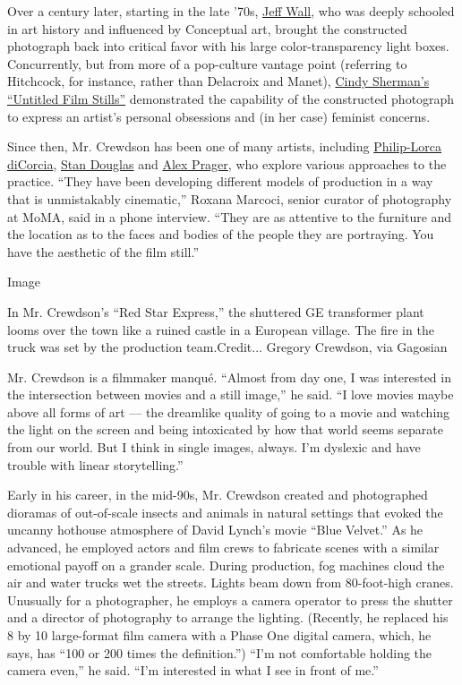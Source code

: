 Over a century later, starting in the late '70s,
\href{https://gagosian.com/artists/jeff-wall/}{Jeff Wall}, who was
deeply schooled in art history and influenced by Conceptual art, brought
the constructed photograph back into critical favor with his large
color-transparency light boxes. Concurrently, but from more of a
pop-culture vantage point (referring to Hitchcock, for instance, rather
than Delacroix and Manet),
\href{https://www.moma.org/learn/moma_learning/cindy-sherman-untitled-film-stills-1977-80/}{Cindy
Sherman's ``Untitled Film Stills''} demonstrated the capability of the
constructed photograph to express an artist's personal obsessions and
(in her case) feminist concerns.

Since then, Mr. Crewdson has been one of many artists, including
\href{https://www.moma.org/artists/7027}{Philip-Lorca diCorcia},
\href{https://www.davidzwirner.com/artists/stan-douglas/biography}{Stan
Douglas} and \href{https://www.alexprager.com/}{Alex Prager}, who
explore various approaches to the practice. ``They have been developing
different models of production in a way that is unmistakably
cinematic,'' Roxana Marcoci, senior curator of photography at MoMA, said
in a phone interview. ``They are as attentive to the furniture and the
location as to the faces and bodies of the people they are portraying.
You have the aesthetic of the film still.''

Image

In Mr. Crewdson's ``Red Star Express,'' the shuttered GE transformer
plant looms over the town like a ruined castle in a European village.
The fire in the truck was set by the production team.Credit... Gregory
Crewdson, via Gagosian

Mr. Crewdson is a filmmaker manqué. ``Almost from day one, I was
interested in the intersection between movies and a still image,'' he
said. ``I love movies maybe above all forms of art --- the dreamlike
quality of going to a movie and watching the light on the screen and
being intoxicated by how that world seems separate from our world. But I
think in single images, always. I'm dyslexic and have trouble with
linear storytelling.''

Early in his career, in the mid-90s, Mr. Crewdson created and
photographed dioramas of out-of-scale insects and animals in natural
settings that evoked the uncanny hothouse atmosphere of David Lynch's
movie ``Blue Velvet.'' As he advanced, he employed actors and film crews
to fabricate scenes with a similar emotional payoff on a grander scale.
During production, fog machines cloud the air and water trucks wet the
streets. Lights beam down from 80-foot-high cranes. Unusually for a
photographer, he employs a camera operator to press the shutter and a
director of photography to arrange the lighting. (Recently, he replaced
his 8 by 10 large-format film camera with a Phase One digital camera,
which, he says, has ``100 or 200 times the definition.'') ``I'm not
comfortable holding the camera even,'' he said. ``I'm interested in what
I see in front of me.''

